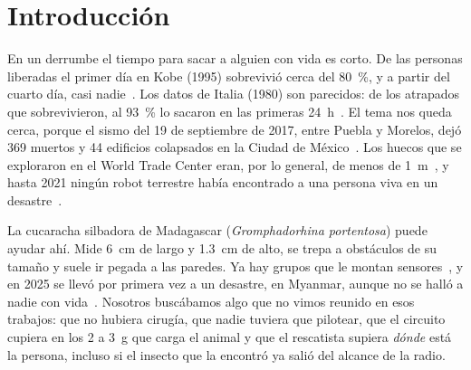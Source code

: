 \documentclass[conference,letterpaper,10pt]{IEEEtran}
\begin{document}
\begin{otherlanguage}{english}
\renewcommand{\abstractname}{Abstract}
\begin{abstract}
After an earthquake, people get trapped in voids that dogs, cameras and robots cannot reach. We present the digital system of a
backpack that lets the Madagascar hissing cockroach help find them, and the network that several backpacks use to report to one
operator. The core counts the hot pixels of a thermal array and decides with an eight-state machine and a stimulus budget; it uses
477 logic elements and gave the same result as its reference model in 11,424 frames. Around it we built a network of three FPGAs
linked by UART, with CRC-16, sequence numbers and relaying. Each node detects its neighbors with Goertzel filters and computes exact
distances with an integer square root, and the receiver locates the person with a CORDIC: the error is 6.2~cm at 31.95~m in 1.10~s,
and the host computes nothing. We also took the core to a 0.050~mm$^2$ SKY130 layout, DRC and LVS clean, that draws 0.58~mA at 1.8~V
and 50~MHz. In 320 simulated missions per case, guiding ten insects raises one-hour detection from 58 to 73\%. The sensor and the
tones are simulated inside the FPGA, and we did not test with insects.
\end{abstract}
\end{otherlanguage}

\section{Introducción}

En un derrumbe el tiempo para sacar a alguien con vida es corto. De las personas liberadas el primer día en Kobe (1995) sobrevivió cerca
del 80~\%, y a partir del cuarto día, casi nadie~\cite{kawata}. Los datos de Italia (1980) son parecidos: de los atrapados que
sobrevivieron, al 93~\% lo sacaron en las primeras 24~h~\cite{noji}. El tema nos queda cerca, porque el sismo del 19 de septiembre de 2017,
entre Puebla y Morelos, dejó 369 muertos y 44 edificios colapsados en la Ciudad de México~\cite{galvis2020}. Los huecos que se
exploraron en el World Trade Center eran, por lo general, de menos de 1~m~\cite{murphy2004}, y hasta 2021 ningún robot terrestre
había encontrado a una persona viva en un desastre~\cite{murphy2021}.

La cucaracha silbadora de Madagascar (\textit{Gromphadorhina portentosa}) puede ayudar ahí. Mide 6~cm de largo y 1.3~cm de alto, se trepa a obstáculos de su tamaño y suele ir pegada a las paredes. Ya hay
grupos que le montan sensores~\cite{tranngoc2023,lin2025,refat2025}, y en 2025 se llevó por primera vez a un desastre, en Myanmar,
aunque no se halló a nadie con vida~\cite{htx2025}. Nosotros buscábamos algo que no vimos reunido en esos trabajos: que no hubiera cirugía, que
nadie tuviera que pilotear, que el circuito cupiera en los 2 a 3~g que carga el animal y que el rescatista supiera \emph{dónde} está la
persona, incluso si el insecto que la encontró ya salió del alcance de la radio.
\end{document}
